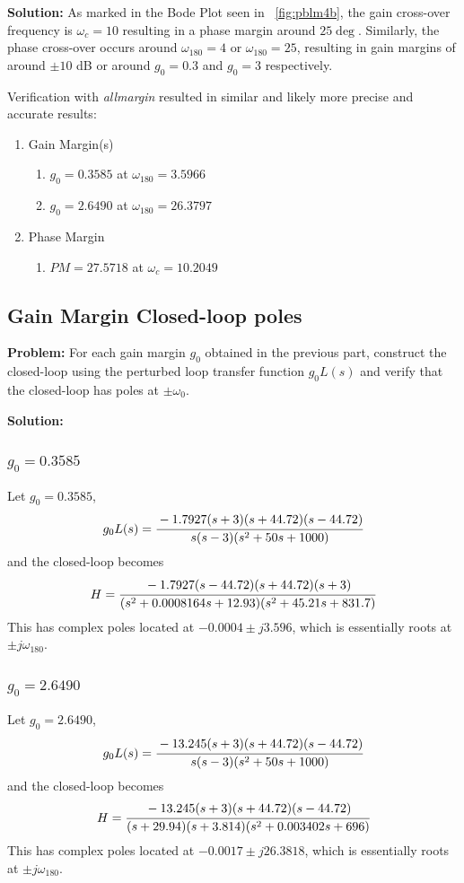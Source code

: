\documentclass[letter]{article}
\numberwithin{equation}{section}
\begin{document}
\textbf{Solution:}
As marked in the Bode Plot seen in \figurename \ \ref{fig:pblm4b}, 
the gain cross-over frequency is $\omega_{c} = 10$ resulting in a phase margin around $25\deg$.
Similarly, the phase cross-over occurs around $\omega_{180} = 4$ or $\omega_{180} = 25$, resulting in gain margins of around $\pm 10$ dB or around $g_0 = 0.3$ and $g_0 = 3$ respectively.

Verification with \emph{allmargin} resulted in similar and likely more precise and accurate results:
\begin{enumerate}
	\item Gain Margin(s)
	\begin{enumerate}
		\item $g_0 = 0.3585$ at $\omega_{180} =  3.5966$
		\item $g_0 = 2.6490$ at $\omega_{180} = 26.3797$
	\end{enumerate}
	\item Phase Margin
	\begin{enumerate}
		\item $PM = 27.5718$ at $\omega_{c} = 10.2049$
	\end{enumerate}
\end{enumerate}

\subsection{Gain Margin Closed-loop poles}
\textbf{Problem:} 
For each gain margin $g_0$ obtained in the previous part, construct the closed-loop using the perturbed loop transfer function $g_0 L(s)$ and verify that the closed-loop has poles at $\pm \omega_0$.

\textbf{Solution:}
\subsubsection{$g_0 = 0.3585$}
Let $g_0 = 0.3585$, \[
	g_0 L(s) =  \cfrac{
		-1.7927 (s+3) (s+44.72) (s-44.72)
	}{
	   s (s-3) (s^2 + 50s + 1000)
	}
\] and the closed-loop becomes \[
	H = \cfrac{ 
          -1.7927 (s-44.72) (s+44.72) (s+3)
	}{
		(s^2 + 0.0008164s + 12.93) (s^2 + 45.21s + 831.7)
	}
\] This has complex poles located at $-0.0004 \pm j 3.596$, which is essentially roots at $\pm j \omega_{180}$.


\subsubsection{$g_0 = 2.6490$}
Let $g_0 = 2.6490$, \[
	g_0 L(s) =  \cfrac{
		-13.245 (s+3) (s+44.72) (s-44.72)
	}{
	   s (s-3) (s^2 + 50s + 1000)
	}
\] and the closed-loop becomes \[
	H = \cfrac{ 
		-13.245 (s+3) (s+44.72) (s-44.72)
	}{
		(s+29.94) (s+3.814) (s^2 + 0.003402s + 696)
	}
\] This has complex poles located at $-0.0017 \pm j 26.3818$, which is essentially roots at $\pm j \omega_{180}$.
\end{document}
